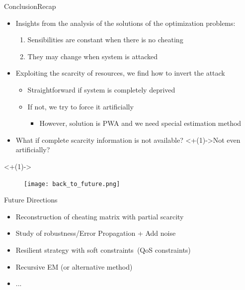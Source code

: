 \documentclass[aspectratio=169]{beamer}
\begin{document}
\begin{frame}{Conclusion}{Recap}
  \begin{itemize}[<+(1)->]
    \item Insights from the analysis of the solutions of the optimization problems:
          \begin{enumerate}
            \item Sensibilities are constant when there is no cheating
            \item They may change when system is attacked
          \end{enumerate}

    \item Exploiting the scarcity of resources, we find how to invert the attack
          \begin{itemize}
            \item Straightforward if system is completely deprived
            \item If not, we try to force it artificially
                  \begin{itemize}
                    \item However, solution is PWA and we need special estimation method
                  \end{itemize}
          \end{itemize}
  \end{itemize}

  \begin{itemize}[<+(1)->]
    \item What if complete scarcity information is not available? \onslide<+(1)->{Not even artificially?}
  \end{itemize}

  \visible<+(1)->{
    \begin{figure}[h]
      \centering
      \texttt{[image: back\_to\_future.png]}
    \end{figure}
  }
\end{frame}

\begin{frame}{Future Directions}
    \begin{itemize}[<+->]
      \item Reconstruction of cheating matrix with partial scarcity
      \item Study of robustness/Error Propagation + Add noise
      \item Resilient strategy with soft constraints (QoS constraints)
      \item Recursive EM (or alternative method)
      \item ...
    \end{itemize}
\end{frame}
\end{document}
